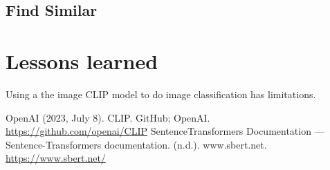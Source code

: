 \documentclass[article, 10pt]{article}
\begin{document}
\subsection{Find Similar}

\section{Lessons learned} 
Using a the image CLIP model to do image classification has limitations. 


\begin{thebibliography}{99}
 OpenAI (2023, July 8). CLIP. GitHub; OpenAI. \url{https://github.com/openai/CLIP}
 SentenceTransformers Documentation — Sentence-Transformers documentation. (n.d.). www.sbert.net. \url{https://www.sbert.net/}


\end{thebibliography}
\end{document}
